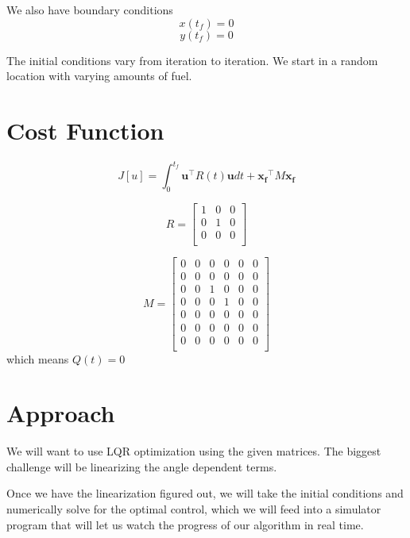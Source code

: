 \documentclass{article}
\begin{document}
We also have boundary conditions
\[
	x(t_f)=0
\]
\[
	y(t_f)=0
\]

The initial conditions vary from iteration to iteration. We start in a random location with varying amounts of fuel.


\section{Cost Function}

\[
	J[u] = \int_0^{t_f} \mathbf{u}^\intercal R(t)\mathbf{u}dt +\mathbf{x_f}^\intercal M \mathbf{x_f}
\]

\[
R = \begin{bmatrix}
	1 & 0 & 0\\
	0 & 1 & 0\\
	0 & 0 & 0\\
\end{bmatrix}
\]

\[
M = \begin{bmatrix}
	0 & 0& 0& 0& 0& 0 \\
	0 & 0& 0& 0& 0& 0 \\
	0 & 0& 1& 0& 0& 0 \\
	0 & 0& 0& 1& 0& 0 \\
	0 & 0& 0& 0& 0& 0 \\
	0 & 0& 0& 0& 0& 0 \\
	0 & 0& 0& 0& 0& 0 \\
\end{bmatrix}
\]
which means $Q(t)=0$


\section{Approach}
We will want to use LQR optimization using the given matrices. The biggest challenge will be linearizing the angle dependent terms.

Once we have the linearization figured out, we will take the initial conditions and numerically solve for the optimal control, which we will feed into a simulator program that will let us watch the progress of our algorithm in real time.
\end{document}
